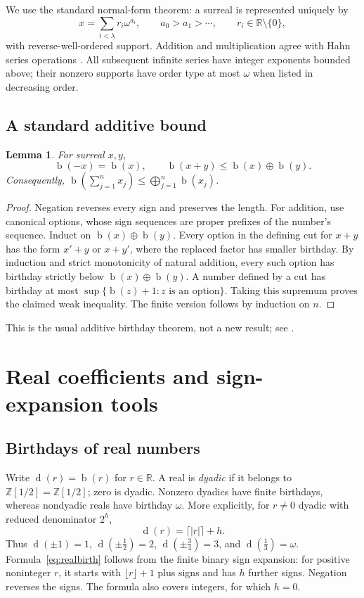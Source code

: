 \documentclass[11pt,letterpaper]{article}
\numberwithin{equation}{section}
\newtheorem{lemma}[theorem]{Lemma}
\theoremstyle{definition}
\theoremstyle{remark}
\newcommand{\R}{\mathbb{R}}
\newcommand{\Z}{\mathbb{Z}}
\newcommand{\D}{\mathbb{Z}[1/2]}
\newcommand{\bd}{\operatorname{b}}
\newcommand{\rd}{\operatorname{d}}
\newcommand{\ns}{\mathbin{\oplus}}
\newcommand{\bigns}{\mathop{\bigoplus}}
\begin{document}
We use the standard normal-form theorem: a surreal is represented uniquely by
\[
 x=\sum_{i<\lambda}r_i\omega^{a_i},
 \qquad a_0>a_1>\cdots,
 \qquad r_i\in\R\setminus\{0\},
\]
with reverse-well-ordered support. Addition and multiplication agree with Hahn
series operations \cite{Gonshor1986,BG2022}. All subsequent infinite series have
integer exponents bounded above; their nonzero supports have order type at most
$\omega$ when listed in decreasing order.

\subsection{A standard additive bound}
\begin{lemma}\label{lem:add}
For surreal $x,y$,
\[
 \bd(-x)=\bd(x),\qquad
 \bd(x+y)\leq\bd(x)\ns\bd(y).
\]
Consequently, $\bd(\sum_{j=1}^n x_j)\leq\bigns_{j=1}^n\bd(x_j)$.
\end{lemma}
\begin{proof}
Negation reverses every sign and preserves the length. For addition, use
canonical options, whose sign sequences are proper prefixes of the number's
sequence. Induct on $\bd(x)\oplus\bd(y)$. Every option in the defining cut for
$x+y$ has the form $x'+y$ or $x+y'$, where the replaced factor has smaller
birthday. By induction and strict monotonicity of natural addition, every such
option has birthday strictly below $\bd(x)\oplus\bd(y)$. A number defined by a
cut has birthday at most $\sup\{\bd(z)+1:z\text{ is an option}\}$.
Taking this supremum proves the claimed weak inequality. The finite version
follows by induction on $n$.
\end{proof}
This is the usual additive birthday theorem, not a new result; see
\cite[p.~96]{Gonshor1986}.

\section{Real coefficients and sign-expansion tools}
\label{sec:signs}
\subsection{Birthdays of real numbers}
Write $\rd(r)=\bd(r)$ for $r\in\R$. A real is \emph{dyadic} if it belongs to
$\D=\Z[1/2]$; zero is dyadic. Nonzero dyadics have finite birthdays, whereas
nondyadic reals have birthday $\omega$. More explicitly, for
$r\neq0$ dyadic with reduced denominator $2^h$,
\begin{equation}\label{eq:realbirth}
 \rd(r)=\lceil |r|\rceil+h.
\end{equation}
Thus $\rd(\pm1)=1$, $\rd(\pm\tfrac12)=2$, $\rd(\pm\tfrac34)=3$, and
$\rd(\tfrac13)=\omega$. Formula~\eqref{eq:realbirth} follows from the finite
binary sign expansion: for positive noninteger $r$, it starts with
$\lfloor r\rfloor+1$ plus signs and has $h$ further signs. Negation reverses
the signs. The formula also covers integers, for which $h=0$.
\end{document}

